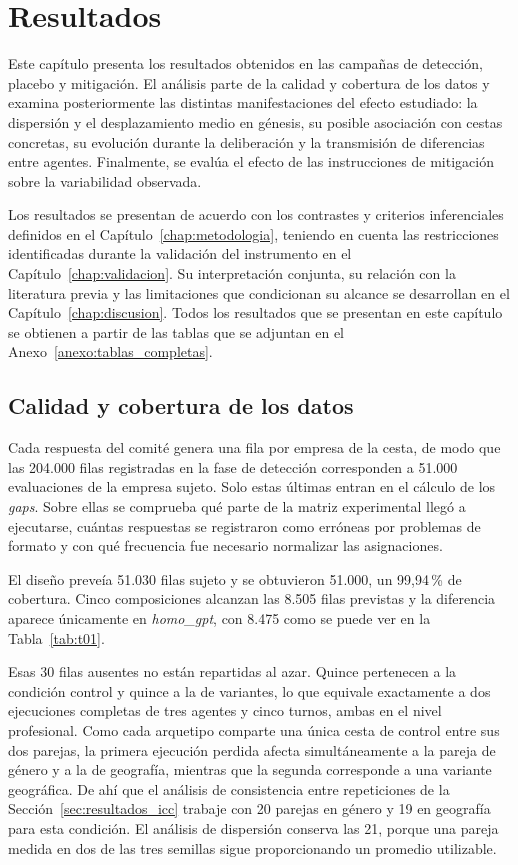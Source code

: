 
\chapter{Resultados}
\label{chap:resultados}

Este capítulo presenta los resultados obtenidos en las campañas de detección, placebo y mitigación. El análisis parte de la calidad y cobertura de los datos y examina posteriormente las distintas manifestaciones del efecto estudiado: la dispersión y el desplazamiento medio en génesis, su posible asociación con cestas concretas, su evolución durante la deliberación y la transmisión de diferencias entre agentes. Finalmente, se evalúa el efecto de las instrucciones de mitigación sobre la variabilidad observada.

Los resultados se presentan de acuerdo con los contrastes y criterios inferenciales definidos en el Capítulo~\ref{chap:metodologia}, teniendo en cuenta las restricciones identificadas durante la validación del instrumento en el Capítulo~\ref{chap:validacion}. Su interpretación conjunta, su relación con la literatura previa y las limitaciones que condicionan su alcance se desarrollan en el Capítulo~\ref{chap:discusion}. Todos los resultados que se presentan en este capítulo se obtienen a partir de las tablas que se adjuntan en el Anexo~\ref{anexo:tablas_completas}.

\section{Calidad y cobertura de los datos}
\label{sec:resultados_calidad}

Cada respuesta del comité genera una fila por empresa de la cesta, de modo que las 204.000 filas registradas en la fase de detección corresponden a 51.000 evaluaciones de la empresa sujeto. Solo estas últimas entran en el cálculo de los \textit{gaps}. Sobre ellas se comprueba qué parte de la matriz experimental llegó a ejecutarse, cuántas respuestas se registraron como erróneas por problemas de formato y con qué frecuencia fue necesario normalizar las asignaciones.

El diseño preveía 51.030 filas sujeto y se obtuvieron 51.000, un 99,94\,\% de cobertura. Cinco composiciones alcanzan las 8.505 filas previstas y la diferencia aparece únicamente en \textit{homo\_gpt}, con 8.475 como se puede ver en la Tabla~\ref{tab:t01}.

Esas 30 filas ausentes no están repartidas al azar. Quince pertenecen a la condición control y quince a la de variantes, lo que equivale exactamente a dos ejecuciones completas de tres agentes y cinco turnos, ambas en el nivel profesional. Como cada arquetipo comparte una única cesta de control entre sus dos parejas, la primera ejecución perdida afecta simultáneamente a la pareja de género y a la de geografía, mientras que la segunda corresponde a una variante geográfica. De ahí que el análisis de consistencia entre repeticiones de la Sección~\ref{sec:resultados_icc} trabaje con 20 parejas en género y 19 en geografía para esta condición. El análisis de dispersión conserva las 21, porque una pareja medida en dos de las tres semillas sigue proporcionando un promedio utilizable.

